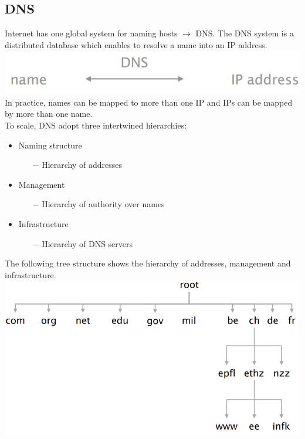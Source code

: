 \documentclass[a4paper, fontsize=8pt, landscape, DIV=1]{scrartcl}
\begin{document}
\begin{multicols*}{4}
		\subsection{DNS}
		Internet has one global system for naming hosts $\rightarrow$ DNS. The DNS
		system is a distributed database which enables to resolve a name into an IP
		address.\\
		\includegraphics[width=\columnwidth]{images/Application_Layer/dns_ip.png}
		In practice, names can be mapped to more than one IP and IPs can be mapped by
		more than one name.\\
		To scale, DNS adopt three intertwined hierarchies: 
		\begin{itemize}[noitemsep]
			\item Naming structure
			\begin{itemize}
				\item[$-$] Hierarchy of addresses
			\end{itemize}
			\item Management
			\begin{itemize}
				\item[$-$] Hierarchy of authority over names 
			\end{itemize}
			\item Infrastructure
			\begin{itemize}
				\item[$-$] Hierarchy of DNS servers
			\end{itemize}
		\end{itemize}
		The following tree structure shows the hierarchy of addresses, management and
		infrastructure.   
		\includegraphics[width=\columnwidth]{images/Application_Layer/dns_tree.png}

\end{multicols*}
\end{document}
